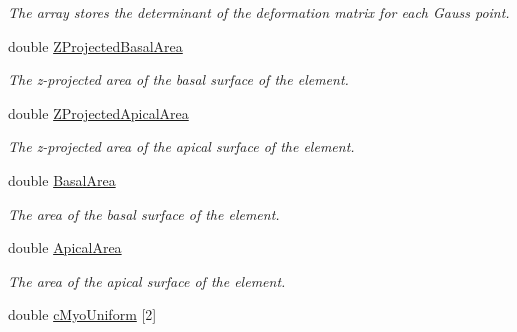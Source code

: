\begin{DoxyCompactItemize}
\begin{DoxyCompactList}\small\item\em The array stores the determinant of the deformation matrix for each Gauss point. \end{DoxyCompactList}\item 
\hypertarget{classShapeBase_a51a8101057e2771172a4716c128705d7}{}double \hyperlink{classShapeBase_a51a8101057e2771172a4716c128705d7}{Z\+Projected\+Basal\+Area}\label{classShapeBase_a51a8101057e2771172a4716c128705d7}

\begin{DoxyCompactList}\small\item\em The z-\/projected area of the basal surface of the element. \end{DoxyCompactList}\item 
\hypertarget{classShapeBase_aa7043ddacbcd92480cb54467a2777627}{}double \hyperlink{classShapeBase_aa7043ddacbcd92480cb54467a2777627}{Z\+Projected\+Apical\+Area}\label{classShapeBase_aa7043ddacbcd92480cb54467a2777627}

\begin{DoxyCompactList}\small\item\em The z-\/projected area of the apical surface of the element. \end{DoxyCompactList}\item 
\hypertarget{classShapeBase_a2ae2b0b1dfd0672a39897e780d861254}{}double \hyperlink{classShapeBase_a2ae2b0b1dfd0672a39897e780d861254}{Basal\+Area}\label{classShapeBase_a2ae2b0b1dfd0672a39897e780d861254}

\begin{DoxyCompactList}\small\item\em The area of the basal surface of the element. \end{DoxyCompactList}\item 
\hypertarget{classShapeBase_adb4227c13db7e34dd1af182d143af47b}{}double \hyperlink{classShapeBase_adb4227c13db7e34dd1af182d143af47b}{Apical\+Area}\label{classShapeBase_adb4227c13db7e34dd1af182d143af47b}

\begin{DoxyCompactList}\small\item\em The area of the apical surface of the element. \end{DoxyCompactList}\item 
\hypertarget{classShapeBase_a485e95cb1e7a440e57884d4df5ee1350}{}double \hyperlink{classShapeBase_a485e95cb1e7a440e57884d4df5ee1350}{c\+Myo\+Uniform} \mbox{[}2\mbox{]}\label{classShapeBase_a485e95cb1e7a440e57884d4df5ee1350}


\end{DoxyCompactItemize}
